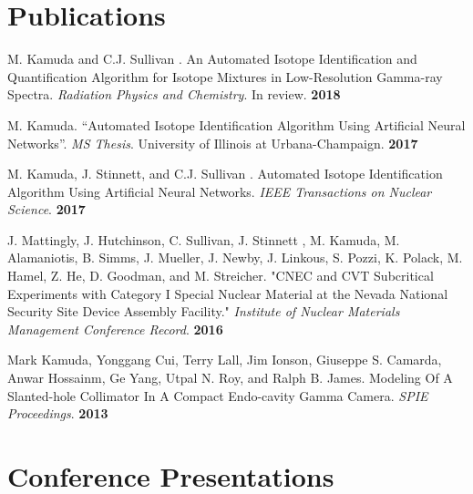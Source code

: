 \documentclass[margin]{res}
\begin{document}
\begin{resume}

\section{Publications}
%

M. Kamuda and C.J. Sullivan . An Automated Isotope Identification and Quantification Algorithm for Isotope Mixtures in Low-Resolution Gamma-ray Spectra. \textit{Radiation Physics and Chemistry}. In review. \hfill \textbf{2018}

\vspace{-.05in}

M. Kamuda.  ``Automated Isotope Identification Algorithm Using Artificial Neural Networks''.  \textit{MS Thesis}.  University of Illinois at Urbana-Champaign. \hfill \textbf{2017}

M. Kamuda, J. Stinnett, and C.J. Sullivan . Automated Isotope Identification Algorithm Using Artificial Neural Networks. \textit{IEEE Transactions on Nuclear Science}. \hfill \textbf{2017}


J. Mattingly, J. Hutchinson, C. Sullivan, J. Stinnett , M. Kamuda, M. Alamaniotis, B. Simms, J. Mueller, J. Newby, J. Linkous, S. Pozzi, K. Polack, M. Hamel, Z. He, D. Goodman, and M. Streicher.  "CNEC and CVT Subcritical Experiments with Category I Special Nuclear Material at the Nevada National Security Site Device Assembly Facility." \textit{Institute of Nuclear Materials Management Conference Record}. \hfill \textbf{2016}



 Mark Kamuda, Yonggang Cui, Terry Lall, Jim Ionson, Giuseppe S. Camarda, Anwar Hossainm, Ge Yang, Utpal N. Roy, and Ralph B. James. Modeling Of A Slanted-hole Collimator In A Compact Endo-cavity Gamma Camera. \textit{SPIE Proceedings}. \hfill \textbf{2013}








\section{Conference Presentations}


\end{resume}
\end{document}
